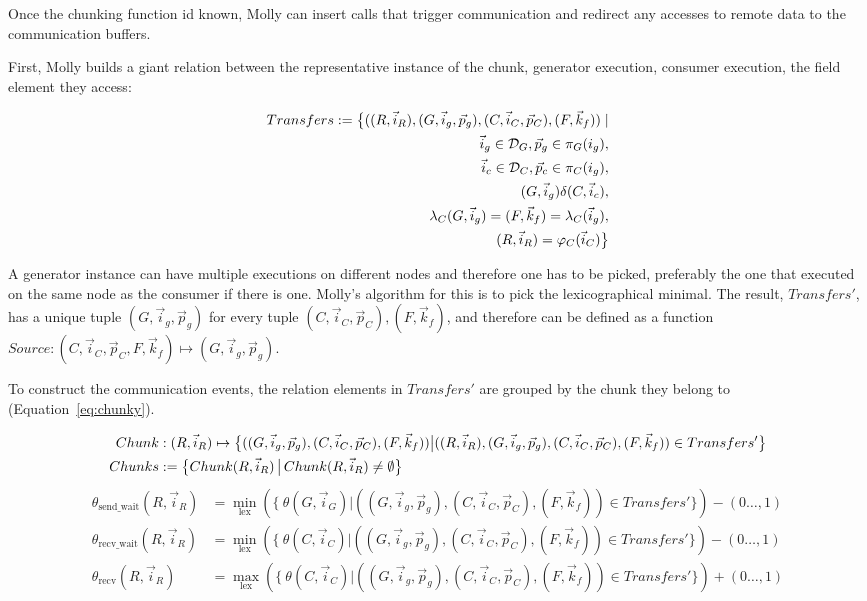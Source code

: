 \documentclass{sigplanconf}
\newcommand{\Dom}{{\cal D}}
\begin{document}
Once the chunking function id known, Molly can insert calls that trigger communication and redirect any accesses to remote data to the communication buffers.

First, Molly builds a giant relation between the representative instance of the chunk, generator execution, consumer execution, the field element they access:

\begin{align*}
  Transfers := \big\{ ((R, \vec i_R), (G, \vec i_g, \vec p_g), (C, \vec i_C, \vec p_C), (F, \vec k_f)) \mid \\
     \vec i_g \in \Dom_G, \vec p_g \in \pi_G(i_g), \\
     \vec i_c \in \Dom_C, \vec p_c \in \pi_C(i_g),\\
     (G, \vec i_g) \delta (C, \vec i_c),\\
     \lambda_C(G, \vec i_g) = (F, \vec k_f) = \lambda_C(\vec i_g),\\
     (R, \vec i_R) = \varphi_C(\vec i_C) 
\big\}
\end{align*}

A generator instance can have multiple executions on different nodes and therefore one has to be picked, preferably the one that executed on the same node as the consumer if there is one. Molly's algorithm for this is to pick the lexicographical minimal. The result, $Transfers'$, has a unique tuple $(G, \vec i_g, \vec p_g)$ for every tuple $(C, \vec i_C, \vec p_C), (F, \vec k_f)$, and therefore can be defined as a function $Source: (C, \vec i_C, \vec p_C, F, \vec k_f) \mapsto (G, \vec i_g, \vec p_g)$.

To construct the communication events, the relation elements in $Transfers'$ are grouped by the chunk they belong to (Equation~\ref{eq:chunky}).

\begin{figure*}[tb]
\begin{align}
  Chunk&: (R, \vec i_R) \mapsto  \big\{  ((G, \vec i_g, \vec p_g), (C, \vec i_C, \vec p_C), (F, \vec k_f)) \big | ((R, \vec i_R), (G, \vec i_g, \vec p_g), (C, \vec i_C, \vec p_C), (F, \vec k_f)) \in Transfers' \big\} \notag \\
  Chunks &:= \big\{ Chunk(R, \vec i_R) \,\big|\, Chunk(R, \vec i_R) \neq \emptyset \big\} \label{eq:chunky}
  \end{align}
  \begin{align}
    \theta_\text{send\_wait}(R, \vec i_R) &= \min_\text{lex}( \{ \ \theta(G, \vec i_G) | ((G, \vec i_g, \vec p_g), (C, \vec i_C, \vec p_C), (F, \vec k_f)) \in Transfers' \}) - ( 0\dots , 1 ) \label{eq:beforegenerator} \\
    \theta_\text{recv\_wait}(R, \vec i_R) &= \min_\text{lex}( \{ \ \theta(C, \vec i_C) | ((G, \vec i_g, \vec p_g), (C, \vec i_C, \vec p_C), (F, \vec k_f)) \in Transfers' \}) - ( 0\dots , 1 ) \label{eq:aftergenerator} \\
    \theta_\text{recv}(R, \vec i_R) &= \max_\text{lex}( \{ \ \theta(C, \vec i_C) | ((G, \vec i_g, \vec p_g), (C, \vec i_C, \vec p_C), (F, \vec k_f)) \in Transfers' \}) + ( 0\dots , 1 ) \label{eq:afterconsumer}
\end{align}
\end{figure*}
\end{document}
